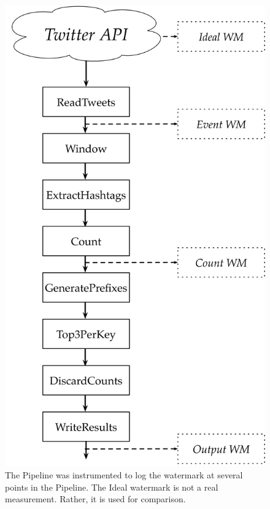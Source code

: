 \begin{figure}
	\centering
	\includegraphics[height=0.6\textheight]{images/diags/eval-twitter-watermarks}
	\caption[The Twitter Pipeline showing the points at which watermarks were measured.]{The Pipeline was instrumented to log the watermark at several points in the Pipeline. The Ideal watermark is not a real measurement. Rather, it is used for comparison.}
	\label{fig:eval:twitter:pipeline-instrument}
\end{figure}



